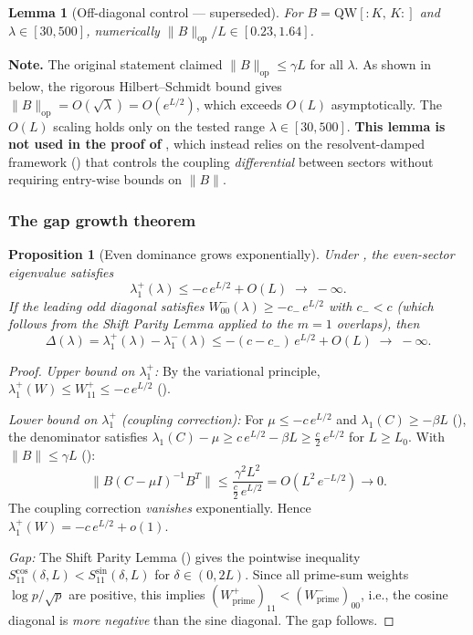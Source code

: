 \documentclass[12pt,a4paper]{article}
\newtheorem{lemma}[theorem]{Lemma}
\newtheorem{proposition}[theorem]{Proposition}
\theoremstyle{definition}
\theoremstyle{remark}
\begin{document}
\begin{lemma}[Off-diagonal control --- superseded]
\label{lem:L3}
For $B = \mathrm{QW}[{:}K,\,K{:}]$ and $\lambda \in [30, 500]$, numerically $\|B\|_{\mathrm{op}}/L \in [0.23, 1.64]$.
\end{lemma}

\noindent\textbf{Note.} The original statement claimed $\|B\|_{\mathrm{op}} \leq \gamma L$ for all $\lambda$. As shown in  below, the rigorous Hilbert--Schmidt bound gives $\|B\|_{\mathrm{op}} = O(\sqrt{\lambda}) = O(e^{L/2})$, which exceeds $O(L)$ asymptotically. The $O(L)$ scaling holds only on the tested range $\lambda \in [30, 500]$. \textbf{This lemma is not used in the proof of }, which instead relies on the resolvent-damped framework () that controls the coupling \emph{differential} between sectors without requiring entry-wise bounds on $\|B\|$.

\subsubsection{The gap growth theorem}

\begin{proposition}[Even dominance grows exponentially]
\label{prop:gap-growth}
Under , the even-sector eigenvalue satisfies
\[
  \lambda_1^+(\lambda) \leq -c\,e^{L/2} + O(L) \;\to\; -\infty.
\]
If the leading odd diagonal satisfies $W_{00}^-(\lambda) \geq -c_-\,e^{L/2}$ with $c_- < c$ (which follows from the Shift Parity Lemma applied to the $m=1$ overlaps), then
\begin{equation}
\label{eq:gap-exp}
  \Delta(\lambda) = \lambda_1^+(\lambda) - \lambda_1^-(\lambda) \leq -(c - c_-)\,e^{L/2} + O(L) \;\to\; -\infty.
\end{equation}
\end{proposition}

\begin{proof}
\emph{Upper bound on $\lambda_1^+$:} By the variational principle, $\lambda_1^+(W) \leq W_{11}^+ \leq -c\,e^{L/2}$ ().

\emph{Lower bound on $\lambda_1^+$ (coupling correction):} For $\mu \leq -c\,e^{L/2}$ and $\lambda_1(C) \geq -\beta L$ (), the denominator satisfies $\lambda_1(C) - \mu \geq c\,e^{L/2} - \beta L \geq \tfrac{c}{2}\,e^{L/2}$ for $L \geq L_0$. With $\|B\| \leq \gamma L$ ():
\[
  \|B(C - \mu I)^{-1}B^T\| \leq \frac{\gamma^2 L^2}{\frac{c}{2}\,e^{L/2}} = O(L^2\,e^{-L/2}) \to 0.
\]
The coupling correction \emph{vanishes} exponentially. Hence $\lambda_1^+(W) = -c\,e^{L/2} + o(1)$.

\emph{Gap:} The Shift Parity Lemma () gives the pointwise inequality $S_{11}^{\cos}(\delta, L) < S_{11}^{\sin}(\delta, L)$ for $\delta \in (0, 2L)$. Since all prime-sum weights $\log p / \sqrt{p}$ are positive, this implies $(W_{\mathrm{prime}}^+)_{11} < (W_{\mathrm{prime}}^-)_{00}$, i.e., the cosine diagonal is \emph{more negative} than the sine diagonal. The gap follows.
\end{proof}
\end{document}
